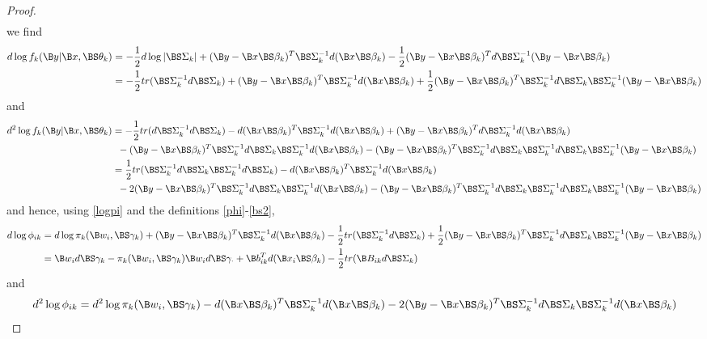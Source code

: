 \begin{proof}
\begin{align*}
\end{align*}
we find 
\begin{align*}
d\log f_{k}(\B y|\B x,\BS\theta_{k})&=-\frac{1}{2}d\log|\BS\Sigma_{k}|+(\B y-\B x\BS \beta_{k})^{T}\BS\Sigma_{k}^{-1}d(\B x\BS \beta_{k})-\frac{1}{2}(\B y-\B x\BS \beta_{k})^{T}d\BS\Sigma_{k}^{-1}(\B y-\B x\BS\beta_{k})\\
&=-\frac{1}{2}tr(\BS\Sigma_{k}^{-1}d\BS\Sigma_{k})+(\B y-\B x\BS \beta_{k})^{T}\BS\Sigma_{k}^{-1}d(\B x\BS \beta_{k})+\frac{1}{2}(\B y-\B x\BS \beta_{k})^{T}\BS\Sigma_{k}^{-1}d\BS\Sigma_{k}\BS\Sigma_{k}^{-1}(\B y-\B x\BS\beta_{k})\\
\end{align*}
and
\begin{align*}
d^{2}\log f_{k}(\B y|\B x,\BS\theta_{k})&=-\frac{1}{2}tr(d\BS\Sigma_{k}^{-1}d\BS\Sigma_{k})-d(\B x\BS \beta_{k})^{T}\BS\Sigma_{k}^{-1}d(\B x\BS \beta_{k})+(\B y-\B x\BS \beta_{k})^{T}d\BS\Sigma_{k}^{-1}d(\B x\BS \beta_{k})\\
&\;\;-(\B y-\B x\BS \beta_{k})^{T}\BS\Sigma_{k}^{-1}d\BS\Sigma_{k}\BS\Sigma_{k}^{-1}d(\B x\BS\beta_{k})-(\B y-\B x\BS \beta_{k})^{T}\BS\Sigma_{k}^{-1}d\BS\Sigma_{k}\BS\Sigma_{k}^{-1}d\BS\Sigma_{k}\BS\Sigma_{k}^{-1}(\B y-\B x\BS\beta_{k})\\
&=\frac{1}{2}tr(\BS\Sigma_{k}^{-1}d\BS\Sigma_{k}\BS\Sigma_{k}^{-1}d\BS\Sigma_{k})-d(\B x\BS \beta_{k})^{T}\BS\Sigma_{k}^{-1}d(\B x\BS \beta_{k})\\
&\;\;-2(\B y-\B x\BS \beta_{k})^{T}\BS\Sigma_{k}^{-1}d\BS\Sigma_{k}\BS\Sigma_{k}^{-1}d(\B x\BS\beta_{k})-(\B y-\B x\BS \beta_{k})^{T}\BS\Sigma_{k}^{-1}d\BS\Sigma_{k}\BS\Sigma_{k}^{-1}d\BS\Sigma_{k}\BS\Sigma_{k}^{-1}(\B y-\B x\BS\beta_{k})\\
\end{align*}
and hence, using \eqref{logpi} and the definitions \eqref{phi}-\eqref{bs2},
\begin{align}
d\log \phi_{ik}&=d\log \pi_{k}(\B w_{i},\BS\gamma_k)+(\B y-\B x\BS \beta_{k})^{T}\BS\Sigma_{k}^{-1}d(\B x\BS \beta_{k})-\frac{1}{2}tr(\BS\Sigma_{k}^{-1}d\BS\Sigma_{k})+\frac{1}{2}(\B y-\B x\BS \beta_{k})^{T}\BS\Sigma_{k}^{-1}d\BS\Sigma_{k}\BS\Sigma_{k}^{-1}(\B y-\B x\BS\beta_{k})\nonumber\\
&=\B w_{i} d\BS \gamma_{k} -\pi_{k}(\B w_{i},\BS\gamma_k)\B w_{i}d\BS\gamma_{\cdot}+\B b^{T}_{ik}d(\B x_{i}\BS \beta_{k})-\frac{1}{2}tr(\B B_{ik}d\BS\Sigma_{k})\nonumber
\end{align}
and
\begin{align}
d^{2}\log \phi_{ik}&=d^{2}\log \pi_{k}(\B w_{i},\BS\gamma_k)-d(\B x\BS \beta_{k})^{T}\BS\Sigma_{k}^{-1}d(\B x\BS \beta_{k})-2(\B y-\B x\BS \beta_{k})^{T}\BS\Sigma_{k}^{-1}d\BS\Sigma_{k}\BS\Sigma_{k}^{-1}d(\B x\BS\beta_{k})\nonumber\\

\end{align}
\end{proof}
